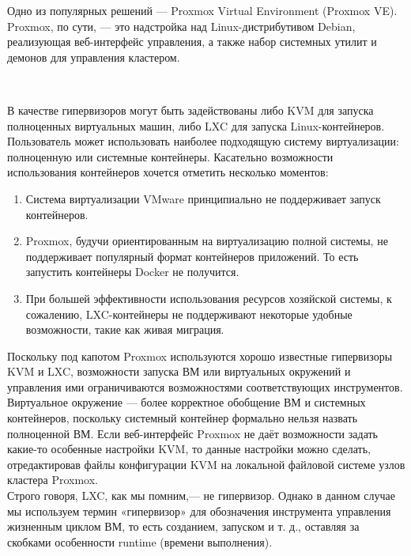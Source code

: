 \documentclass[14pt, a4paper]{article}
\begin{document}
Одно из популярных решений — Proxmox Virtual Environment (Proxmox VE). Proxmox, по сути, — это
надстройка над Linux-дистрибутивом Debian, реализующая веб-интерфейс управления, а также набор
системных утилит и демонов для управления кластером.


\begin{figure}[h]
    \centering
    \\ 
    \label{framework} 
\end{figure}

В качестве гипервизоров могут быть задействованы либо KVM для запуска полноценных виртуальных
машин, либо LXC для запуска Linux-контейнеров. Пользователь может использовать наиболее
подходящую систему виртуализации: полноценную или системные контейнеры. Касательно
возможности использования контейнеров хочется отметить несколько моментов:
\begin{enumerate}
    \item Система виртуализации VMware принципиально не поддерживает запуск контейнеров.
    \item Proxmox, будучи ориентированным на виртуализацию полной системы, не поддерживает
    популярный формат контейнеров приложений. То есть запустить контейнеры Docker не
    получится.
    \item При большей эффективности использования ресурсов хозяйской системы, к сожалению,
    LXC-контейнеры не поддерживают некоторые удобные возможности, такие как живая
    миграция.
\end{enumerate}

Поскольку под капотом Proxmox используются хорошо известные гипервизоры KVM и LXC,
возможности запуска ВМ или виртуальных окружений и управления ими ограничиваются
возможностями соответствующих инструментов. Виртуальное окружение — более корректное
обобщение ВМ и системных контейнеров, поскольку системный контейнер формально нельзя назвать
полноценной ВМ. Если веб-интерфейс Proxmox не даёт возможности задать какие-то особенные
настройки KVM, то данные настройки можно сделать, отредактировав файлы конфигурации KVM на
локальной файловой системе узлов кластера Proxmox.\\

Строго говоря, LXC, как мы помним,— не гипервизор. Однако в данном случае мы используем термин
«гипервизор» для обозначения инструмента управления жизненным циклом ВМ, то есть созданием,
запуском и т. д., оставляя за скобками особенности runtime (времени выполнения).\\
\end{document}
